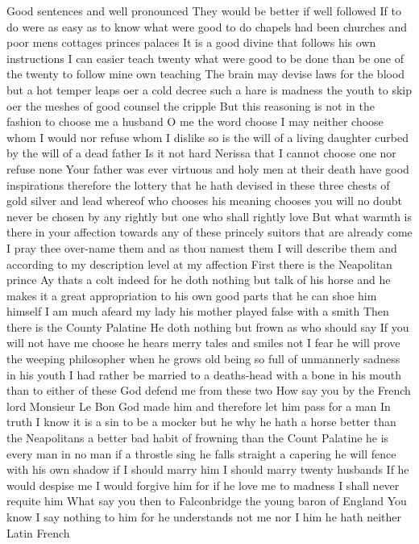 Good sentences and well pronounced
They would be better if well followed
If to do were as easy as to know what were good to
do chapels had been churches and poor mens
cottages princes palaces It is a good divine that
follows his own instructions I can easier teach
twenty what were good to be done than be one of the
twenty to follow mine own teaching The brain may
devise laws for the blood but a hot temper leaps
oer a cold decree such a hare is madness the
youth to skip oer the meshes of good counsel the
cripple But this reasoning is not in the fashion to
choose me a husband O me the word choose I may
neither choose whom I would nor refuse whom I
dislike so is the will of a living daughter curbed
by the will of a dead father Is it not hard
Nerissa that I cannot choose one nor refuse none
Your father was ever virtuous and holy men at their
death have good inspirations therefore the lottery
that he hath devised in these three chests of gold
silver and lead whereof who chooses his meaning
chooses you will no doubt never be chosen by any
rightly but one who shall rightly love But what
warmth is there in your affection towards any of
these princely suitors that are already come
I pray thee over-name them and as thou namest
them I will describe them and according to my
description level at my affection
First there is the Neapolitan prince
Ay thats a colt indeed for he doth nothing but
talk of his horse and he makes it a great
appropriation to his own good parts that he can
shoe him himself I am much afeard my lady his
mother played false with a smith
Then there is the County Palatine
He doth nothing but frown as who should say If you
will not have me choose he hears merry tales and
smiles not I fear he will prove the weeping
philosopher when he grows old being so full of
unmannerly sadness in his youth I had rather be
married to a deaths-head with a bone in his mouth
than to either of these God defend me from these
two
How say you by the French lord Monsieur Le Bon
God made him and therefore let him pass for a man
In truth I know it is a sin to be a mocker but
he why he hath a horse better than the
Neapolitans a better bad habit of frowning than
the Count Palatine he is every man in no man if a
throstle sing he falls straight a capering he will
fence with his own shadow if I should marry him I
should marry twenty husbands If he would despise me
I would forgive him for if he love me to madness I
shall never requite him
What say you then to Falconbridge the young baron
of England
You know I say nothing to him for he understands
not me nor I him he hath neither Latin French
